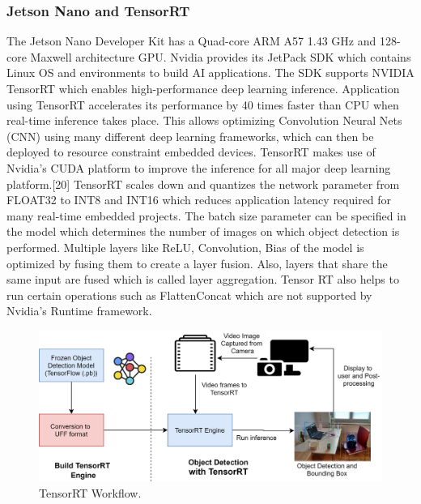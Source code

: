 \documentclass{IEEEtran}
\begin{document}
\subsubsection{Jetson Nano and TensorRT}
The Jetson Nano Developer Kit has a Quad-core ARM A57 1.43 GHz and 128-core Maxwell architecture GPU. Nvidia provides its JetPack SDK which contains Linux OS and environments to build AI applications. The SDK supports NVIDIA TensorRT which enables high-performance deep learning inference. Application using TensorRT accelerates its performance by 40 times faster than CPU when real-time inference takes place. This allows optimizing Convolution Neural Nets (CNN) using many different deep learning frameworks, which can then be deployed to resource constraint embedded devices. TensorRT makes use of Nvidia’s CUDA platform to improve the inference for all major deep learning platform.[20]
\newline TensorRT scales down and quantizes the network parameter from FLOAT32 to INT8 and INT16 which reduces application latency required for many real-time embedded projects. The batch size parameter can be specified in the model which determines the number of images on which object detection is performed. Multiple layers like ReLU, Convolution, Bias of the model is optimized by fusing them to create a layer fusion. Also, layers that share the same input are fused which is called layer aggregation. Tensor RT also helps to run certain operations such as FlattenConcat which are not supported by Nvidia’s Runtime framework.

\begin{figure}[htb]
\centering
\includegraphics[width=1\linewidth]{fig/TensorRT_v2.png}
\caption{ TensorRT Workflow.} \label{fig.structure}
\end{figure}
\end{document}
